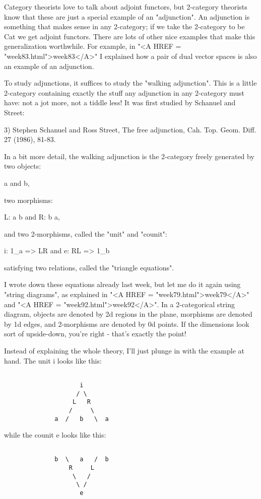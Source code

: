 Category theorists love to talk about adjoint functors, but 2-category
theorists know that these are just a special example of an
"adjunction".  An adjunction is something that makes sense in
any 2-category; if we take the 2-category to be Cat we get adjoint
functors.  There are lots of other nice examples that make this
generalization worthwhile.  For example, in "<A HREF =
"week83.html">week83</A>" I explained how a pair of dual vector
spaces is also an example of an adjunction.


To study adjunctions, it suffices to study the "walking
adjunction".  This is a little 2-category containing exactly the
stuff any adjunction in any 2-category must have: not a jot more, not a
tiddle less!  It was first studied by Schanuel and Street:

3) Stephen Schanuel and Ross Street, The free adjunction,
Cah. Top. Geom.  Diff. 27 (1986), 81-83.

In a bit more detail, the walking adjunction is the 2-category freely
generated by two objects:

a and b,

two morphisms:

L: a \to  b  and  R: b \to  a,

and two 2-morphisms, called the "unit" and "counit":

i: 1_{a} => LR  and  e: RL => 1_{b}

satisfying two relations, called the "triangle equations".  


I wrote down these equations already last week, but let me do it again
using "string diagrams", as explained in "<A HREF =
"week79.html">week79</A>" and "<A HREF =
"week92.html">week92</A>".  In a 2-categorical string diagram,
objects are denoted by 2d regions in the plane, morphisms are denoted by
1d edges, and 2-morphisms are denoted by 0d points.  If the dimensions
look sort of upside-down, you're right - that's exactly the point!

Instead of explaining the whole theory, I'll just plunge in with
the example at hand.  The unit i looks like this:


\begin{verbatim}

                     i
                    / \
                   L   R
                  /     \
              a  /   b   \  a
\end{verbatim}
    
while the counit e looks like this:


\begin{verbatim}

              b  \   a   /  b 
                  R     L  
                   \   / 
                    \ /
                     e
\end{verbatim}
    

